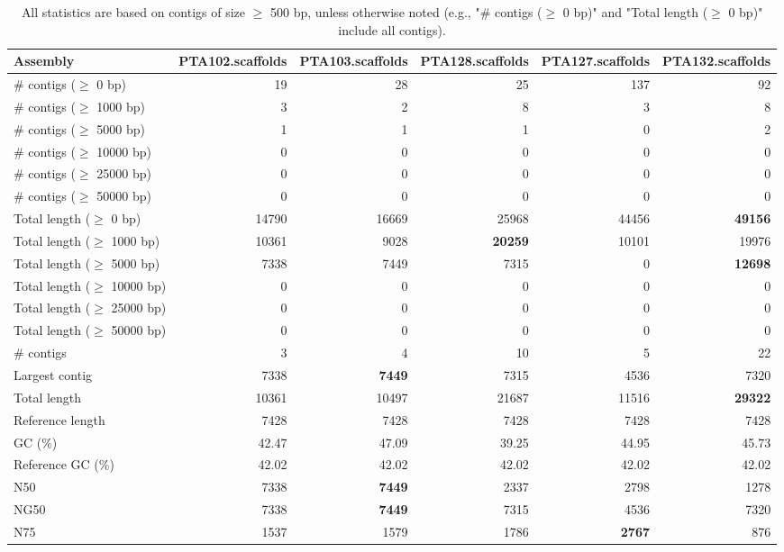 \documentclass[12pt,a4paper]{article}
\begin{document}
\begin{table}[ht]
\begin{center}
\caption{All statistics are based on contigs of size $\geq$ 500 bp, unless otherwise noted (e.g., "\# contigs ($\geq$ 0 bp)" and "Total length ($\geq$ 0 bp)" include all contigs).}
\begin{tabular}{|l*{5}{|r}|}
\hline
Assembly & PTA102.scaffolds & PTA103.scaffolds & PTA128.scaffolds & PTA127.scaffolds & PTA132.scaffolds \\ \hline
\# contigs ($\geq$ 0 bp) & 19 & 28 & 25 & 137 & 92 \\ \hline
\# contigs ($\geq$ 1000 bp) & 3 & 2 & 8 & 3 & 8 \\ \hline
\# contigs ($\geq$ 5000 bp) & 1 & 1 & 1 & 0 & 2 \\ \hline
\# contigs ($\geq$ 10000 bp) & 0 & 0 & 0 & 0 & 0 \\ \hline
\# contigs ($\geq$ 25000 bp) & 0 & 0 & 0 & 0 & 0 \\ \hline
\# contigs ($\geq$ 50000 bp) & 0 & 0 & 0 & 0 & 0 \\ \hline
Total length ($\geq$ 0 bp) & 14790 & 16669 & 25968 & 44456 & {\bf 49156} \\ \hline
Total length ($\geq$ 1000 bp) & 10361 & 9028 & {\bf 20259} & 10101 & 19976 \\ \hline
Total length ($\geq$ 5000 bp) & 7338 & 7449 & 7315 & 0 & {\bf 12698} \\ \hline
Total length ($\geq$ 10000 bp) & 0 & 0 & 0 & 0 & 0 \\ \hline
Total length ($\geq$ 25000 bp) & 0 & 0 & 0 & 0 & 0 \\ \hline
Total length ($\geq$ 50000 bp) & 0 & 0 & 0 & 0 & 0 \\ \hline
\# contigs & 3 & 4 & 10 & 5 & 22 \\ \hline
Largest contig & 7338 & {\bf 7449} & 7315 & 4536 & 7320 \\ \hline
Total length & 10361 & 10497 & 21687 & 11516 & {\bf 29322} \\ \hline
Reference length & 7428 & 7428 & 7428 & 7428 & 7428 \\ \hline
GC (\%) & 42.47 & 47.09 & 39.25 & 44.95 & 45.73 \\ \hline
Reference GC (\%) & 42.02 & 42.02 & 42.02 & 42.02 & 42.02 \\ \hline
N50 & 7338 & {\bf 7449} & 2337 & 2798 & 1278 \\ \hline
NG50 & 7338 & {\bf 7449} & 7315 & 4536 & 7320 \\ \hline
N75 & 1537 & 1579 & 1786 & {\bf 2767} & 876 \\ \hline

\end{tabular}
\end{center}
\end{table}
\end{document}
